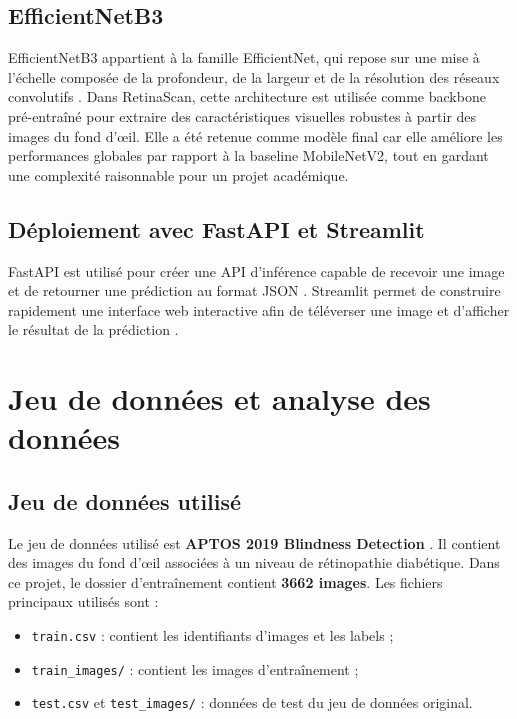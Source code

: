 \documentclass[12pt,a4paper]{report}
\begin{document}
\section{EfficientNetB3}
EfficientNetB3 appartient à la famille EfficientNet, qui repose sur une mise à l'échelle composée de la profondeur, de la largeur et de la résolution des réseaux convolutifs \cite{tan2019}. Dans RetinaScan, cette architecture est utilisée comme backbone pré-entraîné pour extraire des caractéristiques visuelles robustes à partir des images du fond d'œil. Elle a été retenue comme modèle final car elle améliore les performances globales par rapport à la baseline MobileNetV2, tout en gardant une complexité raisonnable pour un projet académique.

\section{Déploiement avec FastAPI et Streamlit}
FastAPI est utilisé pour créer une API d'inférence capable de recevoir une image et de retourner une prédiction au format JSON \cite{fastapi}. Streamlit permet de construire rapidement une interface web interactive afin de téléverser une image et d'afficher le résultat de la prédiction \cite{streamlit}.

\chapter{Jeu de données et analyse des données}

\section{Jeu de données utilisé}
Le jeu de données utilisé est \textbf{APTOS 2019 Blindness Detection} \cite{aptos}. Il contient des images du fond d'œil associées à un niveau de rétinopathie diabétique. Dans ce projet, le dossier d'entraînement contient \textbf{3662 images}. Les fichiers principaux utilisés sont :
\begin{itemize}
    \item \texttt{train.csv} : contient les identifiants d'images et les labels ;
    \item \texttt{train\_images/} : contient les images d'entraînement ;
    \item \texttt{test.csv} et \texttt{test\_images/} : données de test du jeu de données original.
\end{itemize}
\end{document}
